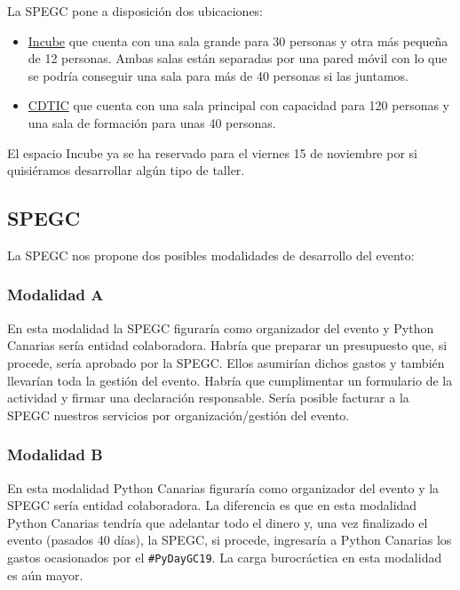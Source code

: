 \documentclass[a4paper, 12pt]{article}
\begin{document}
La SPEGC pone a disposición dos ubicaciones:

\begin{itemize}
    \item \href{https://www.spegc.org/space/incube/}{Incube} que cuenta con una sala grande para 30 personas y otra más pequeña de 12 personas. Ambas salas están separadas por una pared móvil con lo que se podría conseguir una sala para más de 40 personas si las juntamos.
    \item \href{https://www.spegc.org/empresas-y-emprendedores/cdtic/}{CDTIC} que cuenta con una sala principal con capacidad para 120 personas y una sala de formación para unas 40 personas.
\end{itemize}

El espacio Incube ya se ha reservado para el viernes 15 de noviembre por si quisiéramos desarrollar algún tipo de taller.

\subsection*{SPEGC}

La SPEGC nos propone dos posibles modalidades de desarrollo del evento:

\subsubsection*{Modalidad A}

En esta modalidad la SPEGC figuraría como organizador del evento y Python Canarias sería entidad colaboradora. Habría que preparar un presupuesto que, si procede, sería aprobado por la SPEGC. Ellos asumirían dichos gastos y también llevarían toda la gestión del evento. Habría que cumplimentar un formulario de la actividad y firmar una declaración responsable. Sería posible facturar a la SPEGC nuestros servicios por organización/gestión del evento.

\subsubsection*{Modalidad B}

En esta modalidad Python Canarias figuraría como organizador del evento y la SPEGC sería entidad colaboradora. La diferencia es que en esta modalidad Python Canarias tendría que adelantar todo el dinero y, una vez finalizado el evento (pasados 40 días), la SPEGC, si procede, ingresaría a Python Canarias los gastos ocasionados por el \texttt{\#PyDayGC19}. La carga burocráctica en esta modalidad es aún mayor.
\end{document}
